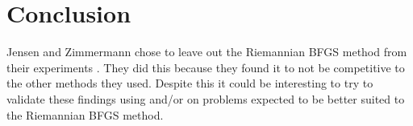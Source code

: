 \section{Conclusion}

Jensen and Zimmermann chose to leave out the Riemannian BFGS method from their experiments \cite[p.~11]{JensenZimmermann2024}. They did this because they found it to not be competitive to the other methods they used. Despite this it could be interesting to try to validate these findings using  and/or on problems expected to be better suited to the Riemannian BFGS method.